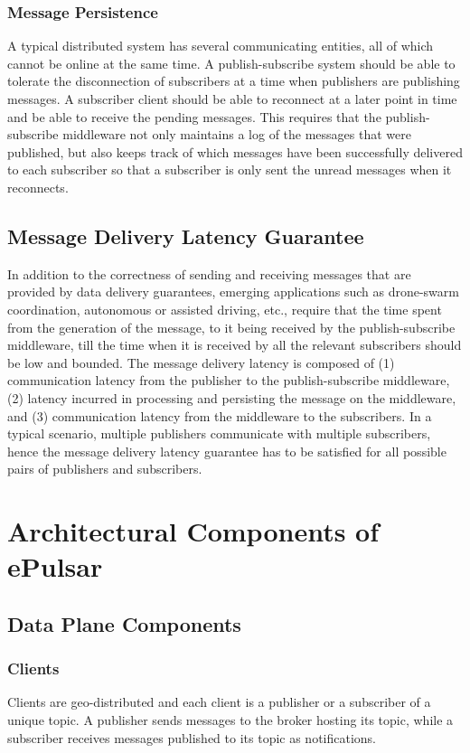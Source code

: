 \subsubsection{Message Persistence}
A typical distributed system has several communicating entities, all of which cannot be online at the same time. A publish-subscribe system should be able to tolerate the disconnection of subscribers at a time when publishers are publishing messages. A subscriber client should be able to reconnect at a later point in time and be able to receive the pending messages. This requires that the publish-subscribe middleware not only maintains a log of the messages that were published, but also keeps track of which messages have been successfully delivered to each subscriber so that a subscriber is only sent the unread messages when it reconnects.
\subsection{Message Delivery Latency Guarantee}
In addition to the correctness of sending and receiving messages that are provided by data delivery guarantees, emerging applications such as drone-swarm coordination, autonomous or assisted driving, etc., require that the time spent from the generation of the message, to it being received by the publish-subscribe middleware, till the time when it is received by all the relevant subscribers should be low and bounded. The message delivery latency is composed of (1) communication latency from the publisher to the publish-subscribe middleware, (2) latency incurred in processing and persisting the message on the middleware, and (3) communication latency from the middleware to the subscribers. In a typical scenario, multiple publishers communicate with multiple subscribers, hence the message delivery latency guarantee has to be satisfied for all possible pairs of publishers and subscribers.

\section{Architectural Components of ePulsar}
\label{sec:epulsar_arch}
\subsection{Data Plane Components}
\subsubsection{Clients}
Clients are geo-distributed and each client is a publisher or a subscriber of a unique topic. A publisher sends messages to the broker hosting its topic, while a subscriber receives messages published to its topic as notifications.
